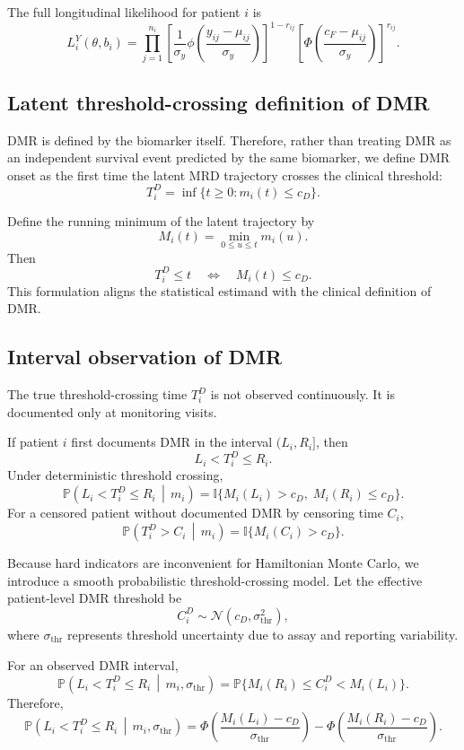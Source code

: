 \documentclass[11pt]{article}
\theoremstyle{remark}
\newcommand{\Normal}{\mathcal{N}}
\newcommand{\Prob}{\mathbb{P}}
\newcommand{\Ind}{\mathbb{I}}
\newcommand{\given}{\,\middle|\,}
\newcommand{\PhiStd}{\Phi}
\newcommand{\phiStd}{\phi}
\begin{document}
The full longitudinal likelihood for patient \(i\) is
\[
L_i^{Y}(\theta,b_i)
=
\prod_{j=1}^{n_i}
\left[
\frac{1}{\sigma_y}
\phiStd
\left(
\frac{y_{ij}-\mu_{ij}}{\sigma_y}
\right)
\right]^{1-r_{ij}}
\left[
\PhiStd
\left(
\frac{c_F-\mu_{ij}}{\sigma_y}
\right)
\right]^{r_{ij}}.
\]

\subsection{Latent threshold-crossing definition of DMR}

DMR is defined by the biomarker itself. Therefore, rather than treating DMR as an independent survival event predicted by the same biomarker, we define DMR onset as the first time the latent MRD trajectory crosses the clinical threshold:
\[
T_i^D
=
\inf\{t\geq 0:m_i(t)\leq c_D\}.
\]

Define the running minimum of the latent trajectory by
\[
M_i(t)=\min_{0\leq u\leq t}m_i(u).
\]
Then
\[
T_i^D\leq t
\quad\Longleftrightarrow\quad
M_i(t)\leq c_D.
\]
This formulation aligns the statistical estimand with the clinical definition of DMR.

\subsection{Interval observation of DMR}

The true threshold-crossing time \(T_i^D\) is not observed continuously. It is documented only at monitoring visits.

If patient \(i\) first documents DMR in the interval \((L_i,R_i]\), then
\[
L_i<T_i^D\leq R_i.
\]
Under deterministic threshold crossing,
\[
\Prob(L_i<T_i^D\leq R_i\given m_i)
=
\Ind\{M_i(L_i)>c_D,\;M_i(R_i)\leq c_D\}.
\]
For a censored patient without documented DMR by censoring time \(C_i\),
\[
\Prob(T_i^D>C_i\given m_i)
=
\Ind\{M_i(C_i)>c_D\}.
\]

Because hard indicators are inconvenient for Hamiltonian Monte Carlo, we introduce a smooth probabilistic threshold-crossing model. Let the effective patient-level DMR threshold be
\[
C_i^D\sim \Normal(c_D,\sigma_{\mathrm{thr}}^2),
\]
where \(\sigma_{\mathrm{thr}}\) represents threshold uncertainty due to assay and reporting variability.

For an observed DMR interval,
\[
\Prob(L_i<T_i^D\leq R_i\given m_i,\sigma_{\mathrm{thr}})
=
\Prob\{M_i(R_i)\leq C_i^D<M_i(L_i)\}.
\]
Therefore,
\[
\Prob(L_i<T_i^D\leq R_i\given m_i,\sigma_{\mathrm{thr}})
=
\PhiStd
\left(
\frac{M_i(L_i)-c_D}{\sigma_{\mathrm{thr}}}
\right)
-
\PhiStd
\left(
\frac{M_i(R_i)-c_D}{\sigma_{\mathrm{thr}}}
\right).
\]
\end{document}
